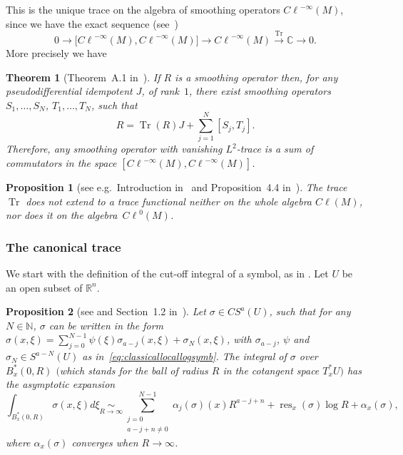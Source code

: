 \documentclass[11pt]{article}
\newtheorem{theorem}{Theorem}
\newtheorem{proposition}{Proposition}
\DeclareMathOperator{\res}{res} \DeclareMathOperator{\Res}{Res}
\DeclareMathOperator{\Tr}{Tr} \DeclareMathOperator{\ord}{ord}
\def \Cl {{C\ell}}
\begin{document}
This is the unique trace on the algebra of smoothing operators $\Cl^{-\infty}(M)$, since we have the exact sequence (see~\cite{guilleminfourier})
\[
0\to\big[\Cl^{-\infty}(M),\Cl^{-\infty}(M)\big]\to \Cl^{-\infty}(M)\overset{\Tr}{\longrightarrow}\mathbb{C}\to0.
\]
More precisely we have

\begin{theorem}[Theorem~A.1 in~\cite{guilleminfourier}]\label{smooth}
If $R$ is a smoothing operator then, for any pseudodifferential idempotent $J$, of rank~$1$, there exist smoothing operators $S_1,\ldots,S_{N}$, $T_1,\ldots,T_{N}$, such that
\[
R=\Tr(R)J+\sum_{j=1}^{N}[S_j,T_j].
\]
Therefore, any smoothing operator with vanishing $L^2$-trace is a sum of commutators in the space $[\Cl^{-\infty}(M),\Cl^{-\infty}(M)]$.
\end{theorem}

\begin{proposition}[see e.g.\ Introduction in~\cite{lesch} and Proposition~4.4 in~\cite{leschtraces}]\label{nocont}
The trace~$\Tr$ does not extend to a trace functional neither on the whole algebra $\Cl(M)$, nor does it on the algebra~$\Cl^0(M)$.
\end{proposition}

\subsubsection{The canonical trace}\label{subsectioncanonicaltrace}

We start with the def\/inition of the cut-of\/f integral of a symbol, as in \cite{sylvie}. Let $U$ be an open subset of $\mathbb{R}^n$.

\begin{proposition}[see \cite{sylvie} and Section~1.2 in~\cite{scott}]
Let $\sigma\in CS^a(U)$, such that for any $N\in\mathbb{N}$, $\sigma$ can be written in the form $ \sigma(x,\xi) =\sum\limits_{j=0}^{N-1}\psi(\xi)\sigma_{a-j}(x,\xi)+\sigma_N(x,\xi)$, with $\sigma_{a-j}$, $\psi$ and $\sigma_N\in S^{a-N}(U)$ as in~\eqref{eq:classicallocallogsymb}. The integral of $\sigma$ over $B^{*}_x(0,R)$ $($which stands for the ball of radius $R$ in the cotangent space $T^{*}_xU)$ has the asymptotic expansion
\[
\int_{B^{*}_x(0,R)}\sigma(x,\xi)d\xi \underset{R\to\infty}{\sim}\sum_{\substack{j=0\\ a-j+n\not=0}}^{N-1}\alpha_j(\sigma)(x)R^{a-j+n} +\res_x(\sigma)\log R+\alpha_x(\sigma),
\]
where $\alpha_x(\sigma)$ converges when $R\to\infty$.
\end{proposition}
\end{document}
